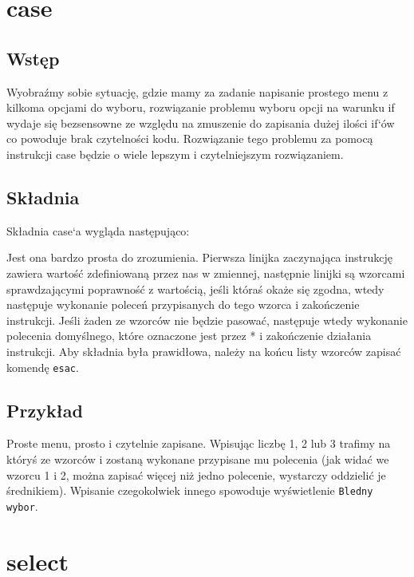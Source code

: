 \documentclass[10 pt, a4paper]{article}
\begin{document}
\section{case}
\subsection{Wstęp}
Wyobraźmy sobie sytuację, gdzie mamy za zadanie napisanie prostego menu z kilkoma
opcjami do wyboru, rozwiązanie problemu wyboru opcji na warunku if wydaje się
bezsensowne ze względu na zmuszenie do zapisania dużej ilości if`ów co powoduje brak
czytelności kodu. Rozwiązanie tego problemu za pomocą instrukcji case będzie o wiele
lepszym i czytelniejszym rozwiązaniem.

\subsection{Składnia}
Składnia case`a wygląda następująco:



Jest ona bardzo prosta do zrozumienia. Pierwsza linijka zaczynająca instrukcję zawiera
wartość zdefiniowaną przez nas w zmiennej, następnie linijki są wzorcami sprawdzającymi
poprawność z wartością, jeśli któraś okaże się zgodna, wtedy następuje wykonanie poleceń
przypisanych do tego wzorca i zakończenie instrukcji. Jeśli żaden ze wzorców nie będzie
pasować, następuje wtedy wykonanie polecenia domyślnego, które oznaczone jest przez * i
zakończenie działania instrukcji. Aby składnia była prawidłowa, należy na końcu listy
wzorców zapisać komendę \texttt{esac}.

\subsection{Przykład} 



Proste menu, prosto i czytelnie zapisane. Wpisując liczbę 1, 2 lub 3 trafimy na któryś ze
wzorców i zostaną wykonane przypisane mu polecenia (jak widać we wzorcu 1 i 2, można
zapisać więcej niż jedno polecenie, wystarczy oddzielić je średnikiem). Wpisanie
czegokolwiek innego spowoduje wyświetlenie \texttt{Bledny wybor}.
\newline

\section{select}
\end{document}
